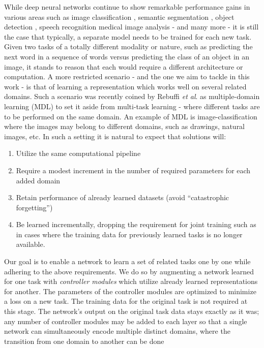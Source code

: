 \documentclass[10pt,journal,compsoc]{IEEEtran}
\newcommand{\etal}{\textit{et al}.}
\begin{document}
While deep neural networks continue to show remarkable performance
gains in various areas such as image classification \cite{krizhevsky2012imagenet},
semantic segmentation \cite{long2015fully}, object detection \cite{girshick2014rich},
speech recognition \cite{hannun2014deep} medical image analysis \cite{litjens2017survey}
- and many more - it is still the case that typically, a separate
model needs to be trained for each new task. Given two tasks of a
totally different modality or nature, such as predicting the next
word in a sequence of words versus predicting the class of an object
in an image, it stands to reason that each would require a different
architecture or computation. A more restricted scenario - and the
one we aim to tackle in this work - is that of learning a representation
which works well on several related domains. Such a scenario was recently
coined by Rebuffi \etal \cite{rebuffi2017learning} as multiple-domain
learning (MDL) to set it aside from multi-task learning - where different
tasks are to be performed on the same domain. An example of MDL is
image-classification where the images may belong to different domains,
such as drawings, natural images, etc. In such a setting it is natural
to expect that solutions will:
\begin{enumerate}
\item Utilize the same computational pipeline
\item Require a modest increment in the number of required parameters for
each added domain
\item Retain performance of already learned datasets (avoid ``catastrophic
forgetting'')
\item Be learned incrementally, dropping the requirement for joint training
such as in cases where the training data for previously learned tasks
is no longer available.
\end{enumerate}
Our goal is to enable a network to learn a set of related tasks one
by one while adhering to the above requirements. We do so by augmenting
a network learned for one task with \emph{controller modules} which
utilize already learned representations for another. The parameters
of the controller modules are optimized to minimize a loss on a new
task. The training data for the original task is not required at this
stage. The network's output on the original task data stays exactly
as it was; any number of controller modules may be added to each layer
so that a single network can simultaneously encode multiple distinct
domains, where the transition from one domain to another can be done
\end{document}
